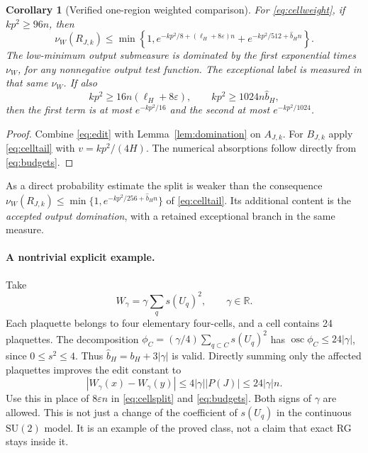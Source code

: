 \documentclass[11pt]{article}
\newtheorem{corollary}[theorem]{Corollary}
\theoremstyle{definition}
\theoremstyle{remark}
\newcommand{\SU}{\mathrm{SU}(2)}
\newcommand{\osc}{\operatorname{osc}}
\begin{document}
\begin{corollary}[Verified one-region weighted comparison]\label{cor:cellsplit}
For \eqref{eq:cellweight}, if $kp^2\ge96n$, then
\begin{equation}
 \nu_W(R_{J,k})\le\min\left\{1,
 e^{-kp^2/8+(\ell_H+8\varepsilon)n}
 +e^{-kp^2/512+\widehat b_Hn}\right\}.
 \label{eq:cellsplit}
\end{equation}
The low-minimum output submeasure is dominated by the first exponential
times $\nu_W$, for any nonnegative output test function. The exceptional
label is measured in that same $\nu_W$. If also
\begin{equation}
 kp^2\ge16n(\ell_H+8\varepsilon),\qquad
 kp^2\ge1024n\widehat b_H,
 \label{eq:budgets}
\end{equation}
then the first term is at most $e^{-kp^2/16}$ and the second at most
$e^{-kp^2/1024}$.
\end{corollary}
\begin{proof}
Combine \eqref{eq:edit} with Lemma~\ref{lem:domination} on $A_{J,k}$.
For $B_{J,k}$ apply \eqref{eq:celltail} with $v=kp^2/(4H)$.
The numerical absorptions follow directly from \eqref{eq:budgets}.
\end{proof}
As a direct probability estimate the split is weaker than the consequence
$\nu_W(R_{J,k})\le\min\{1,e^{-kp^2/256+\widehat b_Hn}\}$ of
\eqref{eq:celltail}. Its additional content is the \emph{accepted output
domination}, with a retained exceptional branch in the same measure.

\paragraph{A nontrivial explicit example.}
Take
\begin{equation}
 W_\gamma=\gamma\sum_q s(U_q)^2,\qquad\gamma\in\mathbb R.
 \label{eq:example}
\end{equation}
Each plaquette belongs to four elementary four-cells, and a cell contains
24 plaquettes. The decomposition
$\phi_C=(\gamma/4)\sum_{q\subset C}s(U_q)^2$ has
$\osc\phi_C\le24|\gamma|$, since $0\le s^2\le4$. Thus
$\widehat b_H=b_H+3|\gamma|$ is valid. Directly summing only the affected
plaquettes improves the edit constant to
\[
 |W_\gamma(x)-W_\gamma(y)|\le4|\gamma||P(J)|\le24|\gamma|n.
\]
Use this in place of $8\varepsilon n$ in \eqref{eq:cellsplit} and
\eqref{eq:budgets}. Both signs of $\gamma$ are allowed. This is not just
a change of the coefficient of $s(U_q)$ in the continuous $\SU$ model.
It is an example of the proved class, not a claim that exact RG stays
inside it.
\end{document}

